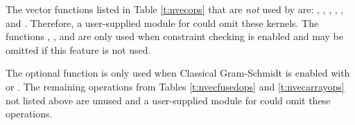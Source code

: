 The vector functions listed in Table \ref{t:nvecops} that are {\em not} used by
{\cvodes} are: , , ,
, , and . Therefore, a user-supplied
{\nvector} module for {\cvodes} could omit these kernels.
The functions , , and  are
only used when constraint checking is enabled and may be omitted if this feature
is not used.

The optional function  is only used when Classical
Gram-Schmidt is enabled with {\spgmr} or {\spfgmr}. The remaining
operations from Tables \ref{t:nvecfusedops} and \ref{t:nvecarrayops}
not listed above are unused and a user-supplied {\nvector} module for
{\cvodes} could omit these operations.
